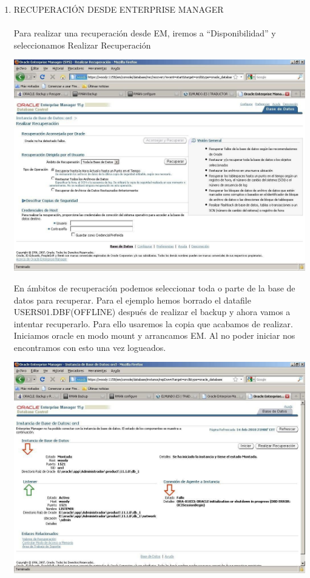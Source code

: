\begin{enumerate}[1.]
\item RECUPERACIÓN DESDE ENTERPRISE MANAGER
\\\\Para realizar una recuperación desde EM, iremos a “Disponibilidad” y seleccionamos Realizar Recuperación
\begin{center}
\includegraphics[width=15cm]{./Imagenes/recu_1} 
\end{center} 
En ámbitos de recuperación podemos seleccionar toda o parte de la base de datos para recuperar.
Para el ejemplo hemos borrado el datafile USERS01.DBF(OFFLINE) después de realizar el backup y ahora vamos a intentar recuperarlo. Para ello usaremos la copia que acabamos de realizar. Iniciamos oracle en modo mount y arrancamos EM. Al no poder iniciar nos encontramos con esto una vez logueados.
\begin{center}
\includegraphics[width=15cm]{./Imagenes/recu_2} 

\end{center}
\end{enumerate}
